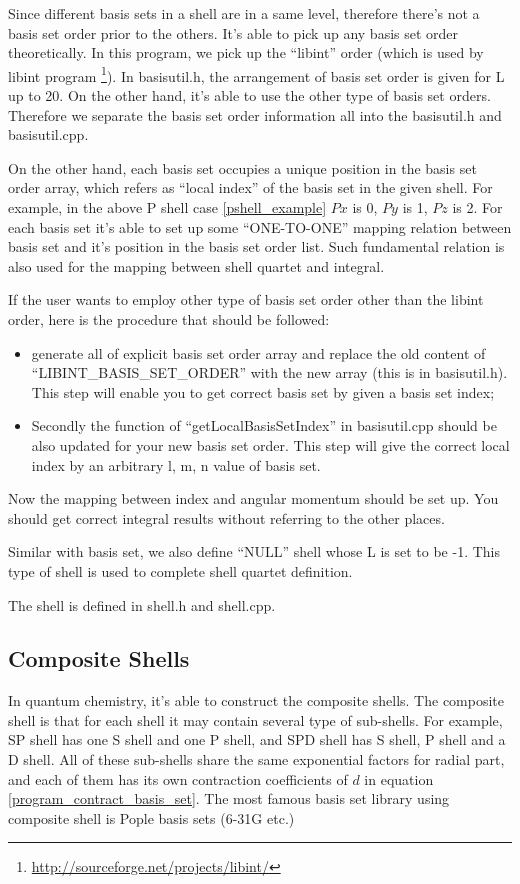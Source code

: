 Since different basis sets in a shell are in a same level, therefore
there's not a basis set order prior to the others. It's able to 
pick up any basis set order theoretically. In this program, we 
pick up the ``libint'' order (which is used by libint program
\footnote{\url{http://sourceforge.net/projects/libint/}}). 
In basisutil.h, the arrangement of basis set order is given for 
L up to 20. On the other hand, it's able to use the other 
type of basis set orders. Therefore we separate the basis set 
order information all into the basisutil.h and basisutil.cpp.

On the other hand, each basis set occupies a unique position in the 
basis set order array, which refers as ``local index'' of the 
basis set in the given shell. For example, in the above P shell
case \ref{pshell_example} $Px$ is 0, $Py$ is 1, $Pz$ is 2. For 
each basis set it's able to set up some ``ONE-TO-ONE'' mapping 
relation between basis set and it's position in the basis set 
order list. Such fundamental relation is also used for the 
mapping between shell quartet and integral.

If the user wants to employ other type of basis set order other 
than the libint order, here is the procedure that should be 
followed:
\begin{itemize}
 \item generate all of explicit basis set order array and 
	 replace the old content of ``LIBINT\_BASIS\_SET\_ORDER''
	 with the new array (this is in basisutil.h). This step
	 will enable you to get correct basis set by given 
	 a basis set index;
 \item Secondly the function of ``getLocalBasisSetIndex'' in
	 basisutil.cpp should be also updated for your new basis 
	 set order. This step will give the correct local index
	 by an arbitrary l, m, n value of basis set.
\end{itemize}
Now the mapping between index and angular momentum should be 
set up. You should get correct integral results without 
referring to the other places.

Similar with basis set, we also define ``NULL'' shell whose 
L is set to be -1. This type of shell is used to complete 
shell quartet definition.

The shell is defined in shell.h and shell.cpp.

\subsection{Composite Shells}
%
\label{composite_shell}
%
%
In quantum chemistry, it's able to construct the composite shells.
The composite shell is that for each shell it may contain several
type of sub-shells. For example, SP shell has one S shell and one 
P shell, and SPD shell has S shell, P shell and a D shell. All of 
these sub-shells share the same exponential factors for radial part,
and each of them has its own contraction coefficients of $d$ in equation
\ref{program_contract_basis_set}. The most famous basis set library using 
composite shell is Pople basis sets (6-31G etc.)

